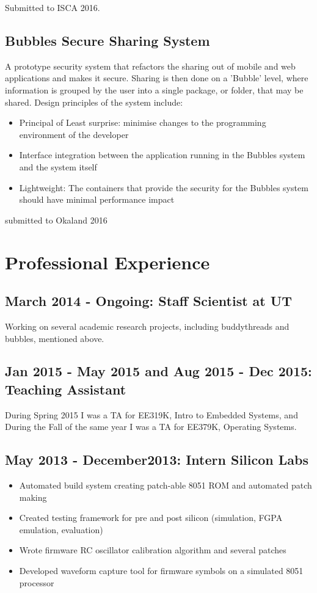 \documentclass[letterpaper,12pt]{resume}
\begin{document}
Submitted to ISCA 2016.

\subsection{Bubbles Secure Sharing System}
\noindent
A prototype security system that refactors the sharing out of mobile and web applications and makes it secure.
Sharing is then done on a 'Bubble' level, where information is grouped by the
user into a single package, or folder,  that may be shared.
Design principles of the system include:
\begin{itemize}
  \item
    Principal of Least surprise: minimise changes to the programming environment of the developer
  \item
    Interface integration between the application running in the Bubbles system and the system itself
  \item
    Lightweight: The containers that provide the security for the Bubbles system
    should have minimal performance impact
\end{itemize}
submitted to Okaland 2016

\section{Professional Experience}
\subsection{March 2014 - Ongoing: Staff Scientist at UT}
Working on several academic research projects, including buddythreads and
bubbles, mentioned above.

\subsection{Jan 2015 - May 2015 and Aug 2015 - Dec 2015: Teaching Assistant}
During Spring 2015 I was a TA for EE319K, Intro to Embedded Systems, and During
the Fall of the same year I was a TA for EE379K, Operating Systems.

\subsection{May 2013 - December2013: Intern Silicon Labs}
\begin{itemize}
  \item
    Automated build system creating patch-able 8051 ROM and automated patch making
  \item
    Created testing framework for pre and post silicon (simulation, FGPA emulation, evaluation)
  \item
    Wrote firmware RC oscillator calibration algorithm and several patches
  \item
    Developed waveform capture tool for firmware symbols on a simulated 8051 processor
\end{itemize}
\end{document}
